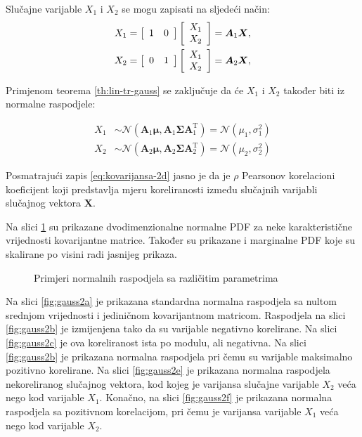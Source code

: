 Slučajne varijable $X_1$ i $X_2$ se mogu zapisati na sljedeći način:
\begin{eqnarray}
	X_1 = \left[\begin{array}{cc}1&0\end{array}\right] \left[\begin{array}{c}X_1\\X_2\end{array}\right] = \bm A_1 \bm X,
	\\
	X_2 = \left[\begin{array}{cc}0&1\end{array}\right] \left[\begin{array}{c}X_1\\X_2\end{array}\right] = \bm A_2 \bm X,
\end{eqnarray}

Primjenom teorema \ref{th:lin-tr-gauss} se zaključuje da će $X_1$ i
$X_2$ također biti iz normalne raspodjele:

\begin{align*}
	X_1 &\sim \mathcal{N}(\bm A_1\bm\mu, \bm A_1 \bm\Sigma \bm A_1^\mathrm T)
		= \mathcal{N}(\mu_1, \sigma_1^2) \\
	X_2 &\sim \mathcal{N}(\bm A_2\bm\mu, \bm A_2 \bm\Sigma \bm A_2^\mathrm T)
		= \mathcal{N}(\mu_2, \sigma_2^2)
\end{align*}

Posmatrajući zapis \eqref{eq:kovarijansa-2d} jasno je da je $\rho$ Pearsonov
korelacioni koeficijent koji predstavlja mjeru koreliranosti između slučajnih
varijabli slučajnog vektora $\bm X$.

Na slici \ref{fig:gauss2} su prikazane dvodimenzionalne normalne PDF za neke
karakteristične vrijednosti kovarijantne matrice. Također su prikazane i
marginalne PDF koje su skalirane po visini radi jasnijeg prikaza.

\begin{figure}[H]
  \centering
	\caption{Primjeri normalnih raspodjela sa različitim parametrima}
	\label{fig:gauss2}
\end{figure}

Na slici \ref{fig:gauss2a} je prikazana standardna normalna raspodjela sa nultom
srednjom vrijednosti i jediničnom kovarijantnom matricom. Raspodjela na slici
\ref{fig:gauss2b} je izmijenjena tako da su varijable negativno korelirane. Na
slici \ref{fig:gauss2c} je ova koreliranost ista po modulu, ali negativna. Na
slici \ref{fig:gauss2b} je prikazana normalna raspodjela pri čemu su varijable
maksimalno pozitivno korelirane. Na slici \ref{fig:gauss2e} je prikazana
normalna raspodjela nekoreliranog slučajnog vektora, kod kojeg je varijansa
slučajne varijable $X_2$ veća nego kod varijable $X_1$. Konačno, na slici
\ref{fig:gauss2f} je prikazana normalna raspodjela sa pozitivnom korelacijom,
pri čemu je varijansa varijable $X_1$ veća nego kod varijable $X_2$.\\

